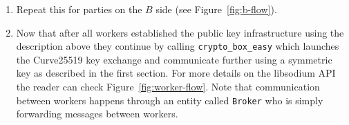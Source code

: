 \begin{enumerate}
  \item Repeat this for parties on the $B$ side (see Figure~\ref{fig:b-flow}).

  \item Now that after all workers established the public key infrastructure
  using the description above they continue by calling \verb|crypto_box_easy|
  which launches the Curve25519 key exchange and communicate further using a
  symmetric key as described in the first section. For more details on the libsodium API
  the reader can check Figure~\ref{fig:worker-flow}. Note that communication
  between workers happens through an entity called \verb|Broker| who is
  simply forwarding messages between workers.

\end{enumerate}


